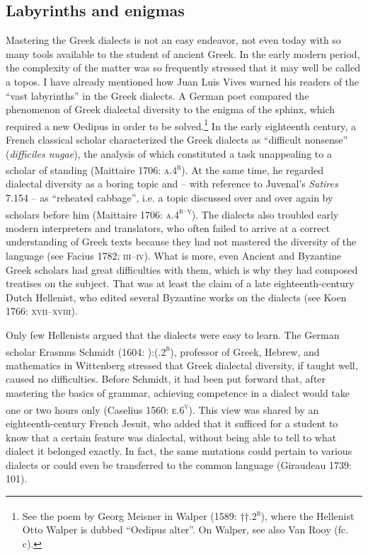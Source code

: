 \subsection{Labyrinths and enigmas}
\hypertarget{Toc19704824}{}\begin{styleStandard}
Mastering the Greek dialects is not an easy endeavor, not even today with so many tools available to the student of ancient Greek. In the early modern period, the complexity of the matter was so frequently stressed that it may well be called a topos. I have already mentioned how Juan Luis Vives warned his readers of the “vast labyrinths” in the Greek dialects. A German poet compared the phenomenon of Greek dialectal diversity to the enigma of the sphinx, which required a new Oedipus in order to be solved.\footnote{ See the poem by Georg Meisner in Walper (1589: ††.2\textsc{\textsuperscript{r}}), where the Hellenist Otto Walper is dubbed “Oedipus alter”. On Walper, see also Van Rooy (fc. c).} In the early eighteenth century, a French classical scholar characterized the Greek dialects as “difficult nonsense” (\textit{difficiles nugae}), the analysis of which constituted a task unappealing to a scholar of standing (Maittaire 1706: \textsc{a.4}\textsc{\textsuperscript{r}}). At the same time, he regarded dialectal diversity as a boring topic and – with reference to Juvenal’s \textit{Satires} 7.154 – as “reheated cabbage”, i.e. a topic discussed over and over again by scholars before him (Maittaire 1706: \textsc{a.4}\textsc{\textsuperscript{r–v}}). The dialects also troubled early modern interpreters and translators, who often failed to arrive at a correct understanding of Greek texts because they had not mastered the diversity of the language (see Facius 1782: \textsc{iii–iv}). What is more, even Ancient and Byzantine Greek scholars had great difficulties with them, which is why they had composed treatises on the subject. That was at least the claim of a late eighteenth-century Dutch Hellenist, who edited several Byzantine works on the dialects (see Koen 1766: \textsc{xvii–xviii}).
\end{styleStandard}

\begin{styleStandard}
Only few Hellenists argued that the dialects were easy to learn. The German scholar Erasmus Schmidt (1604: ):(.2\textsc{\textsuperscript{r}}), professor of Greek, Hebrew, and mathematics in Wittenberg stressed that Greek dialectal diversity, if taught well, caused no difficulties. Before Schmidt, it had been put forward that, after mastering the basics of grammar, achieving competence in a dialect would take one or two hours only (Caselius 1560: \textsc{e.6}\textsc{\textsuperscript{v}}). This view was shared by an eighteenth-century French Jesuit, who added that it sufficed for a student to know that a certain feature was dialectal, without being able to tell to what dialect it belonged exactly. In fact, the same mutations could pertain to various dialects or could even be transferred to the common language (Giraudeau 1739: 101).
\end{styleStandard}


